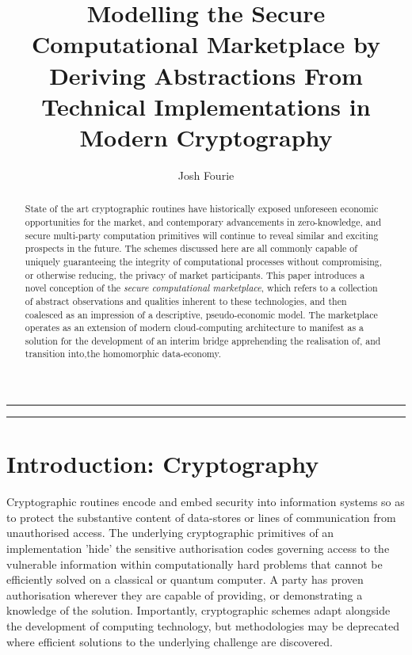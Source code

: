 \documentclass[twocolumn]{scrartcl}
\title{Modelling the Secure Computational Marketplace by Deriving Abstractions From Technical Implementations in Modern Cryptography}
\author{Josh Fourie}
\date{}
\begin{document}
\maketitle


\noindent \rule{7.08cm}{1pt}
\begin{abstract}
	State of the art cryptographic routines have historically exposed unforeseen economic opportunities for the market, and contemporary advancements in zero-knowledge, and secure multi-party computation primitives will continue to reveal similar and exciting prospects in the future. The schemes discussed here are all commonly capable of uniquely guaranteeing the integrity of computational processes without compromising, or otherwise reducing, the privacy of market participants. This paper introduces a novel conception of the \textit{secure computational marketplace}, which refers to a collection of abstract observations and qualities inherent to these technologies, and then coalesced as an impression of a descriptive, pseudo-economic model. The marketplace operates as an extension of modern cloud-computing architecture to manifest as a solution for the development of an interim bridge apprehending the realisation of, and transition into,the homomorphic data-economy.	
\end{abstract}
\noindent \rule{7.08cm}{0.5pt}

\section{Introduction: Cryptography}
Cryptographic routines encode and embed security into information systems so as to protect the substantive content of data-stores or lines of communication from unauthorised access. The underlying cryptographic primitives of an implementation 'hide' the sensitive authorisation codes governing access to the vulnerable information within computationally hard problems that cannot be efficiently solved on a classical or quantum computer. A party has proven authorisation wherever they are capable of providing, or demonstrating a knowledge of the solution. Importantly, cryptographic schemes adapt alongside the development of computing technology, but methodologies may be deprecated where efficient solutions to the underlying challenge are discovered.
\end{document}

